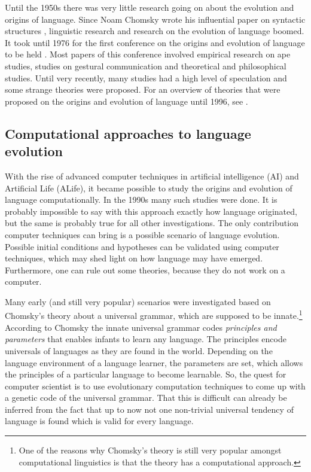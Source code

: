 Until the 1950s there was very little research going on about the evolution and origins of language. Since Noam Chomsky wrote his influential paper on syntactic structures \citep{chomsky:1956}, linguistic research and research on the evolution of language boomed. It took until 1976 for the first conference on the origins and evolution of language to be held \citep{harnad:1976}. Most papers of this conference involved empirical research on ape studies, studies on gestural communication and theoretical and philosophical studies. Until very recently, many studies had a high level of speculation and some strange theories were proposed. For an overview of theories that were proposed on the origins and evolution of language until 1996, see \citealt{aitchison:1996}.


\subsection{Computational approaches to language evolution}

With the rise of advanced computer techniques in artificial intelligence (AI) and Artificial Life (ALife), it became possible to study the origins and evolution of language computationally. In the 1990s many such studies were done. It is probably impossible to say with this approach exactly how language originated, but the same is probably true for all other investigations. The only contribution computer techniques can bring is a possible scenario of language evolution. Possible initial conditions and hypotheses can be validated using computer techniques, which may shed light on how language may have emerged. Furthermore, one can rule out some theories, because they do not work on a computer.


Many early (and still very popular) scenarios were investigated based on Chomsky's theory about a {\sc universal grammar}, which are supposed to be innate.\footnote{One of the reasons why Chomsky's theory is still very popular amongst computational linguistics is that the theory has a computational approach.} According to Chomsky the innate universal grammar codes {\em principles and parameters} that enables infants to learn any language. The principles encode universals of languages as they are found in the world. Depending on the language environment of a language learner, the parameters are set, which allows the principles of a particular language to become learnable. So, the quest for computer scientist is to use evolutionary computation techniques to come up with a genetic code of the universal grammar. That this is difficult can already be inferred from the fact that up to now not one non-trivial universal tendency of language is found which is valid for every language.

